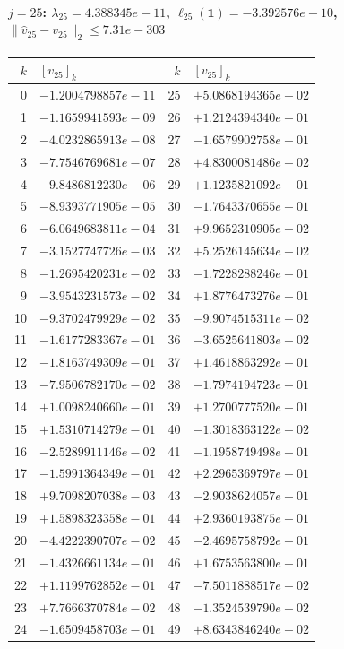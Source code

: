 \paragraph{$j = 25$: $\lambda_{25} = 4.388345e-11$, \quad $\ell_{25}(\mathbf{1}) = -3.392576e-10$, \quad $\|\hat{v}_{25} - v_{25}\|_2 \leq 7.31e-303$}
\begin{center}
{\footnotesize
\begin{tabular}{r@{\;\;}l@{\quad}r@{\;\;}l}
\toprule
$k$ & $[v_{25}]_k$ & $k$ & $[v_{25}]_k$ \\
\midrule
0 & $-1.2004798857e-11$ & 25 & $+5.0868194365e-02$ \\
1 & $-1.1659941593e-09$ & 26 & $+1.2124394340e-01$ \\
2 & $-4.0232865913e-08$ & 27 & $-1.6579902758e-01$ \\
3 & $-7.7546769681e-07$ & 28 & $+4.8300081486e-02$ \\
4 & $-9.8486812230e-06$ & 29 & $+1.1235821092e-01$ \\
5 & $-8.9393771905e-05$ & 30 & $-1.7643370655e-01$ \\
6 & $-6.0649683811e-04$ & 31 & $+9.9652310905e-02$ \\
7 & $-3.1527747726e-03$ & 32 & $+5.2526145634e-02$ \\
8 & $-1.2695420231e-02$ & 33 & $-1.7228288246e-01$ \\
9 & $-3.9543231573e-02$ & 34 & $+1.8776473276e-01$ \\
10 & $-9.3702479929e-02$ & 35 & $-9.9074515311e-02$ \\
11 & $-1.6177283367e-01$ & 36 & $-3.6525641803e-02$ \\
12 & $-1.8163749309e-01$ & 37 & $+1.4618863292e-01$ \\
13 & $-7.9506782170e-02$ & 38 & $-1.7974194723e-01$ \\
14 & $+1.0098240660e-01$ & 39 & $+1.2700777520e-01$ \\
15 & $+1.5310714279e-01$ & 40 & $-1.3018363122e-02$ \\
16 & $-2.5289911146e-02$ & 41 & $-1.1958749498e-01$ \\
17 & $-1.5991364349e-01$ & 42 & $+2.2965369797e-01$ \\
18 & $+9.7098207038e-03$ & 43 & $-2.9038624057e-01$ \\
19 & $+1.5898323358e-01$ & 44 & $+2.9360193875e-01$ \\
20 & $-4.4222390707e-02$ & 45 & $-2.4695758792e-01$ \\
21 & $-1.4326661134e-01$ & 46 & $+1.6753563800e-01$ \\
22 & $+1.1199762852e-01$ & 47 & $-7.5011888517e-02$ \\
23 & $+7.7666370784e-02$ & 48 & $-1.3524539790e-02$ \\
24 & $-1.6509458703e-01$ & 49 & $+8.6343846240e-02$ \\
\bottomrule
\end{tabular}
}
\end{center}

